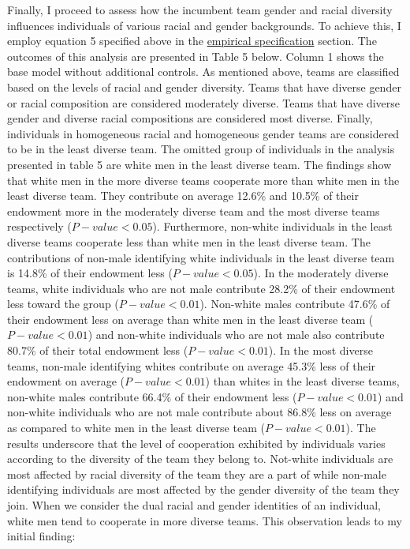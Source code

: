 \noindent Finally, I proceed to assess how the incumbent team gender and racial diversity influences individuals of various racial and gender backgrounds. To achieve this, I employ equation 5 specified above in the \hyperref[subsec:Specification]{empirical specification} section. The outcomes of this analysis are presented in Table 5 below. Column 1 shows the base model without additional controls. As mentioned above, teams are classified based on the levels of racial and gender diversity. Teams that have diverse gender or racial composition are considered moderately diverse. Teams that have diverse gender and diverse racial compositions are considered most diverse. Finally, individuals in homogeneous racial and homogeneous gender teams are considered to be in the least diverse team. The omitted group of individuals in the analysis presented in table 5 are white men in the least diverse team. The findings show that white men in the more diverse teams cooperate more than white men in the least diverse team. They contribute on average 12.6\% and 10.5\% of their endowment more in the moderately diverse team and the most diverse teams respectively ($P-value<0.05$). Furthermore, non-white individuals in the least diverse teams cooperate less than white men in the least diverse team. The contributions of non-male identifying white individuals in the least diverse team is 14.8\% of their endowment less ($P-value<0.05$). In the moderately diverse teams, white individuals who are not male contribute 28.2\% of their endowment less toward the group ($P-value<0.01$). Non-white males contribute 47.6\% of their endowment less on average than white men in the least diverse team ($P-value<0.01$) and non-white individuals who are not male also contribute 80.7\% of their total endowment less ($P-value<0.01$). In the most diverse teams, non-male identifying whites contribute on average 45.3\% less of their endowment on average ($P-value<0.01$) than whites in the least diverse teams, non-white males contribute 66.4\% of their endowment less ($P-value<0.01$) and non-white individuals who are not male contribute about 86.8\% less on average as compared to white men in the least diverse team ($P-value<0.01$). The results underscore that the level of cooperation exhibited by individuals varies according to the diversity of the team they belong to. Not-white individuals are most affected by racial diversity of the team they are a part of while non-male identifying individuals are most affected by the gender diversity of the team they join. When we consider the dual racial and gender identities of an individual, white men tend to cooperate in more diverse teams. This observation leads to my initial finding: 

